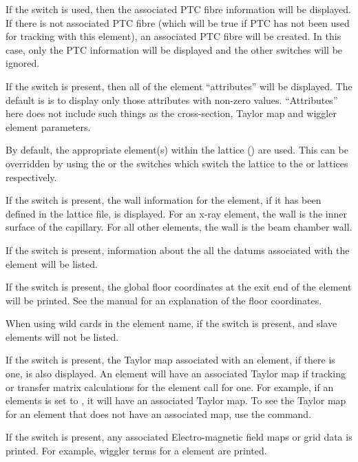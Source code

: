 {{{{{If the  switch is used, then the associated PTC fibre information will be
displayed. If there is not associated PTC fibre (which will be true if PTC has not been
used for tracking with this element), an associated PTC fibre will be created. In this
case, only the PTC information will be displayed and the other switches will be ignored.

If the  switch is present, then all of the element ``attributes'' will be
displayed. The default is is to display only those attributes with non-zero
values. ``Attributes'' here does not include such things as the cross-section, Taylor map
and wiggler element parameters.

By default, the appropriate element(s) within the  lattice ()
are used. This can be overridden by using the  or the  switches
which switch the lattice to the  or  lattices respectively.

If the  switch is present, the wall information for the element, if it has been
defined in the lattice file, is displayed. For an x-ray  element, the wall
is the inner surface of the capillary. For all other elements, the wall is the beam
chamber wall.

If the  switch is present, information about the all the datums associated with
the element will be listed.

If the  switch is present, the global floor coordinates at the exit end
of the element will be printed. See the \bmad manual for an explanation of the floor
coordinates.

When using wild cards in the element name, if the  switch is present,
 and  slave elements will not be listed.

If the  switch is present, the Taylor map associated with an element, if there
is one, is also displayed. An element will have an associated Taylor map if tracking or
transfer matrix calculations for the element call for one. For example, if an elements
 is set to , it will have an associated Taylor map. To see
the Taylor map for an element that does not have an associated map, use the  command.

If the  switch is present, any associated Electro-magnetic field maps or grid
data is printed. For example, wiggler terms for a   element are
printed.

}}}}}

